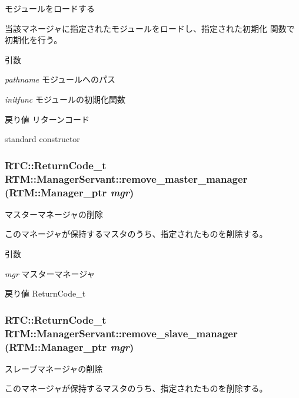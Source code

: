 モジュールをロードする 

当該マネージャに指定されたモジュールをロードし、指定された初期化 関数で初期化を行う。


\begin{DoxyParams}{引数}
\item[{\em pathname}]モジュールへのパス \item[{\em initfunc}]モジュールの初期化関数 \end{DoxyParams}
\begin{DoxyReturn}{戻り値}
リターンコード
\end{DoxyReturn}
standard constructor 
\subsubsection[{remove\_\-master\_\-manager}]{\setlength{\rightskip}{0pt plus 5cm}RTC::ReturnCode\_\-t RTM::ManagerServant::remove\_\-master\_\-manager (RTM::Manager\_\-ptr {\em mgr})}\label{classRTM_1_1ManagerServant_a20453d7ef15894bf7965d858cb90a66f}


マスターマネージャの削除 

このマネージャが保持するマスタのうち、指定されたものを削除する。


\begin{DoxyParams}{引数}
\item[{\em mgr}]マスターマネージャ \end{DoxyParams}
\begin{DoxyReturn}{戻り値}
ReturnCode\_\-t 
\end{DoxyReturn}
\subsubsection[{remove\_\-slave\_\-manager}]{\setlength{\rightskip}{0pt plus 5cm}RTC::ReturnCode\_\-t RTM::ManagerServant::remove\_\-slave\_\-manager (RTM::Manager\_\-ptr {\em mgr})}\label{classRTM_1_1ManagerServant_acc95f96d5e15c4379af297eb32559ab8}


スレーブマネージャの削除 

このマネージャが保持するマスタのうち、指定されたものを削除する。


